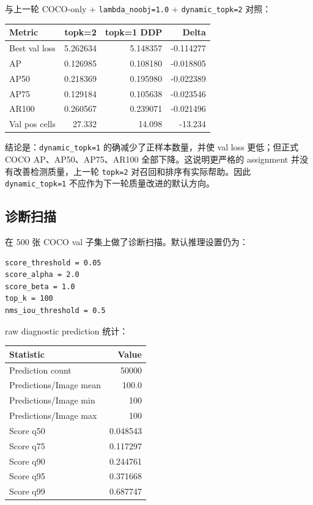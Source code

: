 \documentclass[UTF8]{ctexart}
\begin{document}
与上一轮 COCO-only + \texttt{lambda\_noobj=1.0} + \texttt{dynamic\_topk=2} 对照：

\begin{center}
\begin{tabular}{lrrr}
\toprule
Metric & topk=2 & topk=1 DDP & Delta \\
\midrule
Best val loss & 5.262634 & 5.148357 & -0.114277 \\
AP & 0.126985 & 0.108180 & -0.018805 \\
AP50 & 0.218369 & 0.195980 & -0.022389 \\
AP75 & 0.129184 & 0.105638 & -0.023546 \\
AR100 & 0.260567 & 0.239071 & -0.021496 \\
Val pos cells & 27.332 & 14.098 & -13.234 \\
\bottomrule
\end{tabular}
\end{center}

结论是：\texttt{dynamic\_topk=1} 的确减少了正样本数量，并使 val loss 更低；但正式 COCO AP、AP50、AP75、AR100 全部下降。这说明更严格的 assignment 并没有改善检测质量，上一轮 \texttt{topk=2} 对召回和排序有实际帮助。因此 \texttt{dynamic\_topk=1} 不应作为下一轮质量改进的默认方向。

\subsection{诊断扫描}

在 500 张 COCO val 子集上做了诊断扫描。默认推理设置仍为：

\begin{verbatim}
score_threshold = 0.05
score_alpha = 2.0
score_beta = 1.0
top_k = 100
nms_iou_threshold = 0.5
\end{verbatim}

raw diagnostic prediction 统计：

\begin{center}
\begin{tabular}{lr}
\toprule
Statistic & Value \\
\midrule
Prediction count & 50000 \\
Predictions/Image mean & 100.0 \\
Predictions/Image min & 100 \\
Predictions/Image max & 100 \\
Score q50 & 0.048543 \\
Score q75 & 0.117297 \\
Score q90 & 0.244761 \\
Score q95 & 0.371668 \\
Score q99 & 0.687747 \\
\bottomrule
\end{tabular}
\end{center}
\end{document}
